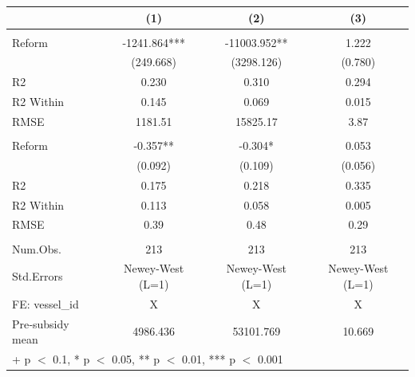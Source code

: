 \begin{table}
\centering
\begin{tabular}[t]{lccc}
\toprule
  & (1) & (2) & (3)\\
\midrule
\addlinespace[0.5em]
\multicolumn{4}{l}{\textit{Panel A}}\\
\midrule \hspace{1em}Reform & -1241.864*** & -11003.952** & 1.222\\
\hspace{1em} & (249.668) & (3298.126) & (0.780)\\
\hspace{1em}R2 & 0.230 & 0.310 & 0.294\\
\hspace{1em}R2 Within & 0.145 & 0.069 & 0.015\\
\hspace{1em}RMSE & 1181.51 & 15825.17 & 3.87\\
\addlinespace[0.5em]
\multicolumn{4}{l}{\textit{Panel B}}\\
\midrule \hspace{1em}Reform & -0.357** & -0.304* & 0.053\\
\hspace{1em} & (0.092) & (0.109) & (0.056)\\
\hspace{1em}R2 & 0.175 & 0.218 & 0.335\\
\hspace{1em}R2 Within & 0.113 & 0.058 & 0.005\\
\hspace{1em}RMSE & 0.39 & 0.48 & 0.29\\
\midrule\\
\hspace{1em}Num.Obs. & 213 & 213 & 213\\
\hspace{1em}Std.Errors & Newey-West (L=1) & Newey-West (L=1) & Newey-West (L=1)\\
\hspace{1em}FE: vessel_id & X & X & X\\
Pre‑subsidy mean & 4986.436 & 53101.769 & 10.669\\
\bottomrule
\multicolumn{4}{l}{\rule{0pt}{1em}+ p $<$ 0.1, * p $<$ 0.05, ** p $<$ 0.01, *** p $<$ 0.001}\\
\end{tabular}
\end{table}
